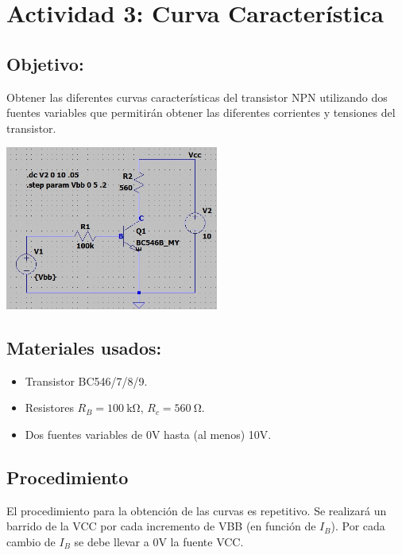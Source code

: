 \newpage

\section{Actividad 3: Curva Característica}

 \subsection{Objetivo:}
Obtener las diferentes curvas características del transistor NPN utilizando dos
fuentes variables que permitirán obtener las diferentes corrientes y tensiones del transistor.

\includegraphics[width=7cm]{./imagenes/Circuito3.jpg}

\subsection{Materiales usados:}
\begin{itemize}
    \item Transistor BC546/7/8/9.
    \item Resistores $R_B = \SI{100}{\kilo\ohm}$, $R_c = \SI{560}{\ohm}$.
    \item Dos fuentes variables de 0V hasta (al menos) 10V.
\end{itemize}


\subsection{Procedimiento}

El procedimiento para la obtención de las curvas es repetitivo. Se realizará un barrido de la VCC por cada incremento de VBB (en función de $I_B$). Por cada cambio de $I_B$ se debe llevar a 0V la fuente VCC.

